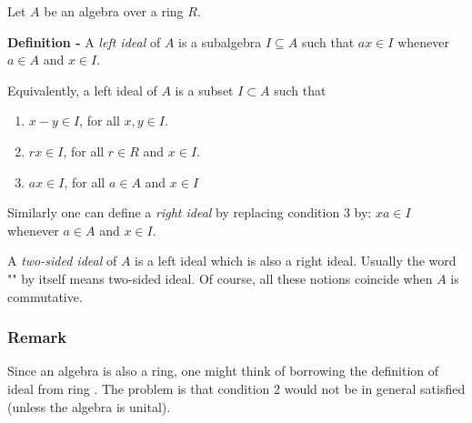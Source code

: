 \documentclass[12pt]{article}
\begin{document}


Let $A$ be an algebra over a ring $R$.

{\bf Definition -} A \emph{left ideal} of $A$ is a subalgebra $I \subseteq A$ such that $ax \in I$ whenever $a \in A$ and $ x \in I$.

Equivalently, a left ideal of $A$ is a subset $I \subset A$ such that
\begin{enumerate}
\item $x - y \in I$, for all $x, y \in I$.
\item $rx \in I$, for all $r \in R$ and $x \in I$.
\item $ax \in I$, for all $a \in A$ and $x \in I$
\end{enumerate}

Similarly one can define a \emph{right ideal} by replacing condition 3 by: $xa \in I$ whenever $a \in A$ and $x \in I$.

A \emph{two-sided ideal} of $A$ is a left ideal which is also a right ideal. Usually the word "" by itself means two-sided ideal. Of course, all these notions coincide when $A$ is commutative.

\subsubsection{Remark}

Since an algebra is also a ring, one might think of borrowing the definition of ideal from ring . The problem is that condition 2 would not be in general satisfied (unless the algebra is unital).
\end{document}
